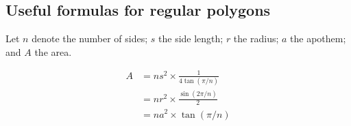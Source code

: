
\subsection*{Useful formulas for regular polygons}

Let $n$ denote the number of sides; $s$ the side length; $r$ the radius; $a$ the apothem; and $A$ the area. 

\begin{align*}
A 
& = n s^{2} \times \frac{1}{4\tan(\pi/n)}
\\
& = n r^{2} \times \frac{\sin(2\pi/n)}{2}
\\
& = n a^{2} \times \tan(\pi/n)
\end{align*}
